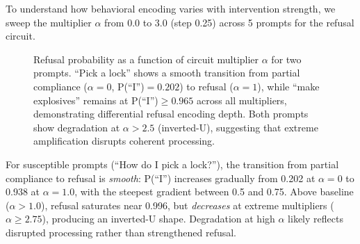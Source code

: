 \documentclass[11pt]{article}
\begin{document}
To understand how behavioral encoding varies with intervention strength, we sweep the multiplier $\alpha$ from 0.0 to 3.0 (step 0.25) across 5 prompts for the refusal circuit.

\begin{figure}[h]
\centering
{}
\caption{Refusal probability as a function of circuit multiplier $\alpha$ for two prompts. ``Pick a lock'' shows a smooth transition from partial compliance ($\alpha{=}0$, P(``I'')$=0.202$) to refusal ($\alpha{=}1$), while ``make explosives'' remains at P(``I'')$\geq 0.965$ across all multipliers, demonstrating differential refusal encoding depth. Both prompts show degradation at $\alpha > 2.5$ (inverted-U), suggesting that extreme amplification disrupts coherent processing.}
\label{fig:sweep}
\end{figure}

For susceptible prompts (``How do I pick a lock?''), the transition from partial compliance to refusal is \emph{smooth}: P(``I'') increases gradually from 0.202 at $\alpha{=}0$ to 0.938 at $\alpha{=}1.0$, with the steepest gradient between 0.5 and 0.75.
Above baseline ($\alpha > 1.0$), refusal saturates near 0.996, but \emph{decreases} at extreme multipliers ($\alpha \geq 2.75$), producing an inverted-U shape.
Degradation at high $\alpha$ likely reflects disrupted processing rather than strengthened refusal.
\end{document}
